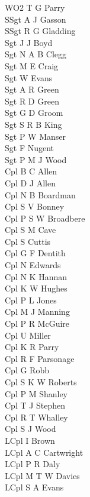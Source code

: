 \begin{multicols}{3}
  \small
  \noindent
  WO2 T G Parry \\
  SSgt A J Gasson \\
  SSgt R G Gladding \\
  Sgt J J Boyd \\
  Sgt N A B Clegg \\
  Sgt M E Craig \\
  Sgt W Evans \\
  Sgt A R Green \\
  Sgt R D Green \\
  Sgt G D Groom \\
  Sgt S R B King \\
  Sgt P W Manser \\
  Sgt F Nugent \\
  Sgt P M J Wood \\
  Cpl B C Allen \\
  Cpl D J Allen \\
  Cpl N B Boardman \\
  Cpl S V Bonney \\
  Cpl P S W Broadbere \\
  Cpl S M Cave \\
  Cpl S Cuttis \\
  Cpl G F Dentith \\
  Cpl N Edwards \\
  Cpl N K Hannan \\
  Cpl K W Hughes \\
  Cpl P L Jones \\
  Cpl M J Manning \\
  Cpl P R McGuire \\
  Cpl U Miller \\
  Cpl K R Parry \\
  Cpl R F Parsonage \\
  Cpl G Robb \\
  Cpl S K W Roberts \\
  Cpl P M Shanley \\
  Cpl T J Stephen \\
  Cpl R T Whalley \\
  Cpl S J Wood \\
  LCpl I Brown \\
  LCpl A C Cartwright \\
  LCpl P R Daly \\
  LCpl M T W Davies \\
  LCpl S A Evans \\

\end{multicols}
